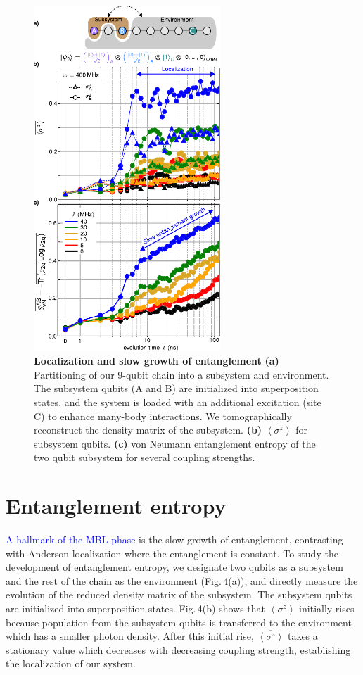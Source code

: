 \begin{figure}[t]
\centering
\includegraphics[width=70mm]{./PDF/fig_4.pdf}
\caption{
\textbf{Localization and slow growth of entanglement}
\textbf{(a)} Partitioning of our 9-qubit chain into a subsystem and environment.
 The subsystem qubits (A and B) are initialized into superposition states, and the system is loaded with an additional excitation (site C) to enhance many-body interactions. We tomographically reconstruct the  density matrix of the subsystem. \textbf{(b)} $\overline{\left< \sigma^z \right>}$ for subsystem qubits. \textbf{(c)} von Neumann entanglement entropy of the two qubit subsystem for several coupling strengths.}
\end{figure}

\section{Entanglement entropy}
\textcolor{blue}{A hallmark of the MBL phase} is the slow growth of entanglement, contrasting with Anderson localization where the entanglement is constant. To study the development of entanglement entropy, we designate two qubits as a subsystem and the rest of the chain as the environment (Fig.\,4(a)), and directly measure the evolution of the reduced density matrix of the subsystem. The subsystem qubits are initialized into superposition states. Fig.\,4(b) shows that $\overline{ \left< \sigma^z \right> }$ initially rises because population from the subsystem qubits is transferred to the environment which has a smaller photon density. After this initial rise, $\overline{ \left< \sigma^z \right> }$ takes a stationary value which decreases with decreasing coupling strength, establishing the localization of our system.


